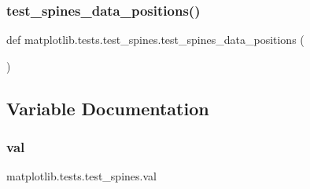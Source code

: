 \subsubsection{\texorpdfstring{test\+\_\+spines\+\_\+data\+\_\+positions()}{test\_spines\_data\_positions()}}
{\footnotesize\ttfamily def matplotlib.\+tests.\+test\+\_\+spines.\+test\+\_\+spines\+\_\+data\+\_\+positions (\begin{DoxyParamCaption}{ }\end{DoxyParamCaption})}



\subsection{Variable Documentation}
\mbox{\label{namespacematplotlib_1_1tests_1_1test__spines_aff3474f224034184c567818da0315bf6}} 
\subsubsection{\texorpdfstring{val}{val}}
{\footnotesize\ttfamily matplotlib.\+tests.\+test\+\_\+spines.\+val}

